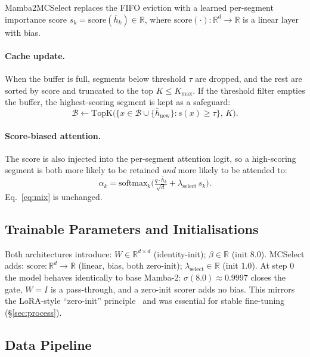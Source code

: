 \documentclass{article}
\begin{document}
Mamba2MCSelect replaces the FIFO eviction with a learned per-segment importance score $s_k = \mathrm{score}(\bar h_k) \in \mathbb R$, where $\mathrm{score}(\cdot):\mathbb R^d\!\to\!\mathbb R$ is a linear layer with bias.

\paragraph{Cache update.} When the buffer is full, segments below threshold $\tau$ are dropped, and the rest are sorted by score and truncated to the top $K\!\le\!K_{\max}$. If the threshold filter empties the buffer, the highest-scoring segment is kept as a safeguard:
\begin{equation}
    \mathcal{B} \leftarrow \mathrm{TopK}\!\big(\{x \in \mathcal{B}\!\cup\!\{\bar{h}_{\text{new}}\}: s(x)\!\ge\!\tau\},\, K\big).
\end{equation}

\paragraph{Score-biased attention.} The score is also injected into the per-segment attention logit, so a high-scoring segment is both more likely to be retained \emph{and} more likely to be attended to:
\begin{equation}
    \alpha_k = \mathrm{softmax}_k\!\Big(\tfrac{q\cdot \bar{h}_k}{\sqrt{d}} + \lambda_{\text{select}}\, s_k\Big).
\end{equation}
Eq.~\eqref{eq:mix} is unchanged.

\subsection{Trainable Parameters and Initialisations}

Both architectures introduce: $W\!\in\!\mathbb{R}^{d\times d}$ (identity-init); $\beta\!\in\!\mathbb{R}$ (init $8.0$). MCSelect adds: $\mathrm{score}\!:\!\mathbb{R}^d\!\to\!\mathbb{R}$ (linear, bias, both zero-init); $\lambda_{\text{select}}\!\in\!\mathbb{R}$ (init $1.0$). At step $0$ the model behaves identically to base Mamba-2: $\sigma(8.0)\!\approx\!0.9997$ closes the gate, $W{=}I$ is a pass-through, and a zero-init scorer adds no bias. This mirrors the LoRA-style ``zero-init'' principle~\citep{hu2021loralowrankadaptationlarge} and was essential for stable fine-tuning (\S\ref{sec:process}).

\subsection{Data Pipeline}
\end{document}
